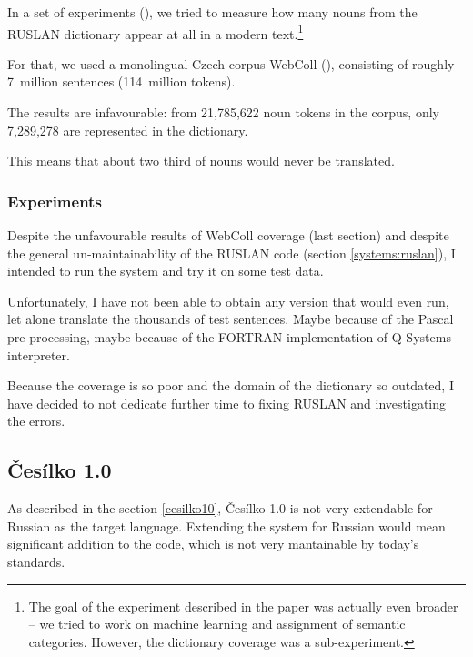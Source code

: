 In a set of experiments (\cite{florida}), we tried to measure how many nouns from the RUSLAN dictionary appear at all in a modern text.\footnote{The goal of the experiment described in the paper was actually even broader -- we tried to work on machine learning and assignment of semantic categories. However, the dictionary coverage was a sub-experiment.} 

For that, we used a monolingual Czech corpus WebColl (\cite{webcoll}), consisting of roughly 7~million sentences (114~million tokens).


The results are infavourable: from 21,785,622 noun tokens in the corpus, only 7,289,278 are represented in the dictionary.

This means that about two third of nouns would never be translated.

\subsubsection{Experiments}

Despite the unfavourable results of WebColl coverage (last section) and despite the  general un-maintainability of the RUSLAN code (section \ref{systems:ruslan}), I intended to run the system and try it on some test data.

Unfortunately, I have not been able to obtain any version that would even run, let alone translate the thousands of test sentences. Maybe because of the Pascal pre-processing, maybe because of the FORTRAN implementation of Q-Systems interpreter.

Because the coverage is so poor and the domain of the dictionary so outdated, I have decided to not dedicate further time to fixing RUSLAN and investigating the errors.

\subsection{Česílko 1.0}
\label{experiments:cesilko10}

As described in the section \ref{cesilko10}, Česílko 1.0 is not very extendable for Russian as the target language. Extending the system for Russian would mean significant addition to the code, which is not very mantainable by today's standards. 

